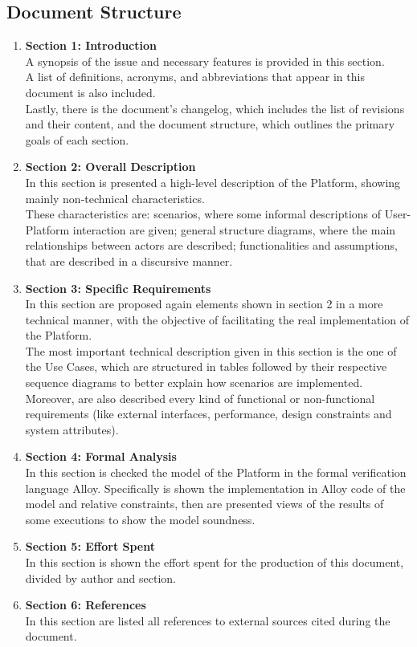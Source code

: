 \subsection{Document Structure}
\begin{enumerate}[label=$\bullet$]
    \item \textbf{Section 1: Introduction}\\
    A synopsis of the issue and necessary features is provided in this section.\\
    A list of definitions, acronyms, and abbreviations that appear in this document is also included.\\
    Lastly, there is the document's changelog, which includes the list of revisions and their content, and the document structure, which outlines the primary goals of each section.
    \item \textbf{Section 2: Overall Description}\\
    In this section is presented a high-level description of the Platform, showing mainly non-technical characteristics.\\
    These characteristics are: 
    scenarios, where some informal descriptions of User-Platform interaction are given; 
    general structure diagrams, where the main relationships between actors are described; 
    functionalities and assumptions, that are described in a discursive manner.
    \item \textbf{Section 3: Specific Requirements}\\
    In this section are proposed again elements shown in section 2 in a more technical manner, with the objective of facilitating the real implementation of the Platform.\\
    The most important technical description given in this section is the one of the Use Cases, which are structured in tables followed by their respective sequence diagrams to better explain how scenarios are implemented.\\
    Moreover, are also described every kind of functional or non-functional requirements (like external interfaces, performance, design constraints and system attributes).
    \item \textbf{Section 4: Formal Analysis}\\
    In this section is checked the model of the Platform in the formal verification language Alloy.
    Specifically is shown the implementation in Alloy code of the model and relative constraints, then are presented views of the results of some executions to show the model soundness.
    \item \textbf{Section 5: Effort Spent}\\
    In this section is shown the effort spent for the production of this document, divided by author and section.
    \item \textbf{Section 6: References}\\
    In this section are listed all references to external sources cited during the document.
\end{enumerate}